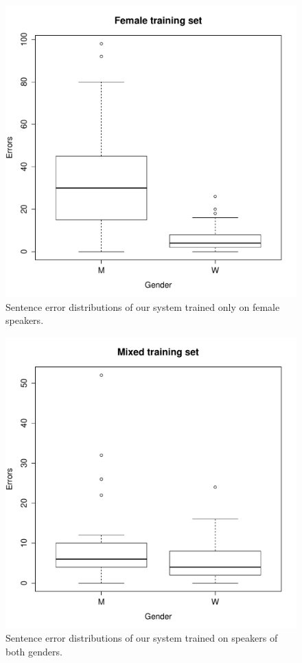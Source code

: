 \documentclass[twocolumn, 11pt]{article}
\begin{document}
\begin{figure}
\includegraphics[width=\columnwidth]{female_only.pdf}
\caption{\label{fig:female} Sentence error distributions of our system trained only on female speakers. }
\end{figure}

\begin{figure}
\includegraphics[width=\columnwidth]{mixed.pdf}
\caption{\label{fig:mixed} Sentence error distributions of our system trained on speakers of both genders. }
\end{figure}
\end{document}

